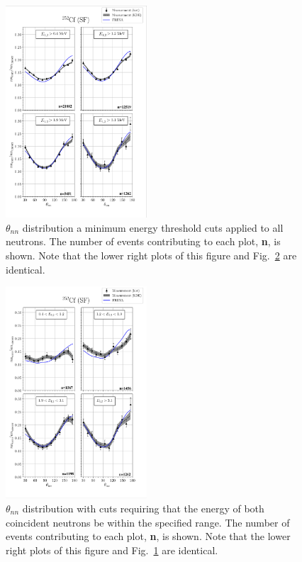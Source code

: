 \documentclass[%
 reprint,
 amsmath,amssymb,
 aps,
 nofootinbib
]{revtex4-1}
\begin{document}
\begin{figure}
\centering
    \includegraphics[width = 0.47\textwidth]{FinalCf252Resultw_freya0KDE(fix).png}
    \caption{
    $\theta_{nn}$ distribution a minimum energy threshold cuts applied to all neutrons.
    The number of events contributing to each plot, \textbf{n}, is shown.  Note that the lower right plots of this figure and Fig.~\ref{fig:Cf(2)} are identical.}
    \label{fig:Cf(0)}
\end{figure}
\begin{figure}
\centering
    \includegraphics[width = 0.47\textwidth]{FinalCf252Resultw_freya2(fix)KDE.png}
    \caption{$\theta_{nn}$ distribution with cuts requiring that the energy of both coincident neutrons be within the specified range.
    The number of events contributing to each plot, \textbf{n}, is shown. Note that the lower right plots of this figure and Fig.~\ref{fig:Cf(0)} are identical.}
    \label{fig:Cf(2)}
\end{figure}
\end{document}
